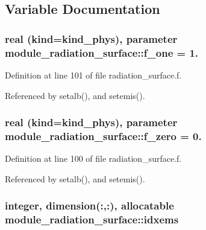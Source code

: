 \subsection{Variable Documentation}
\subsubsection[{\texorpdfstring{f\+\_\+one}{f_one}}]{\setlength{\rightskip}{0pt plus 5cm}real (kind=kind\+\_\+phys), parameter module\+\_\+radiation\+\_\+surface\+::f\+\_\+one = 1.\hspace{0.3cm}{\ttfamily [private]}}\hypertarget{namespacemodule__radiation__surface_a91cec823f595387c92d659d89f307f42}{}\label{namespacemodule__radiation__surface_a91cec823f595387c92d659d89f307f42}


Definition at line 101 of file radiation\+\_\+surface.\+f.



Referenced by setalb(), and setemis().

\subsubsection[{\texorpdfstring{f\+\_\+zero}{f_zero}}]{\setlength{\rightskip}{0pt plus 5cm}real (kind=kind\+\_\+phys), parameter module\+\_\+radiation\+\_\+surface\+::f\+\_\+zero = 0.\hspace{0.3cm}{\ttfamily [private]}}\hypertarget{namespacemodule__radiation__surface_a86e4f42e46e188303b9a8e4d503d1acb}{}\label{namespacemodule__radiation__surface_a86e4f42e46e188303b9a8e4d503d1acb}


Definition at line 100 of file radiation\+\_\+surface.\+f.



Referenced by setalb(), and setemis().

\subsubsection[{\texorpdfstring{idxems}{idxems}}]{\setlength{\rightskip}{0pt plus 5cm}integer, dimension(\+:,\+:), allocatable module\+\_\+radiation\+\_\+surface\+::idxems\hspace{0.3cm}{\ttfamily [private]}}\hypertarget{namespacemodule__radiation__surface_ac33f1f3441f8336d7eb7e15cba26caf7}{}\label{namespacemodule__radiation__surface_ac33f1f3441f8336d7eb7e15cba26caf7}


